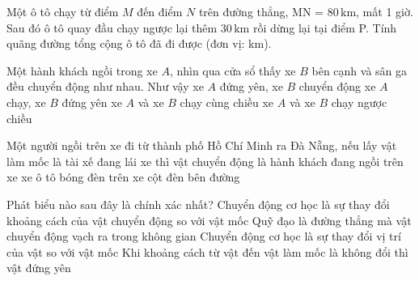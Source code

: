 \begin{ex}
Một ô tô chạy từ điểm $M$ đến điểm $N$ trên đường thẳng, MN = $80\,\text{km}$, mất 1 giờ. Sau đó ô tô quay đầu chạy ngược lại thêm $30\,\text{km}$ rồi dừng lại tại điểm P. Tính quãng đường tổng cộng ô tô đã đi được (đơn vị: km).
\end{ex}

\begin{ex}
Một hành khách ngồi trong xe $A$, nhìn qua cửa sổ thấy xe $B$ bên cạnh và sân ga đều chuyển động như nhau. Như vậy
\choice
{xe $A$ đứng yên, xe $B$ chuyển động}
{xe $A$ chạy, xe $B$ đứng yên}
{\True xe $A$ và xe $B$ chạy cùng chiều}
{xe $A$ và xe $B$ chạy ngược chiều}
\end{ex}


\begin{ex}
Một người ngồi trên xe đi từ thành phố Hồ Chí Minh ra Đà Nẵng, nếu lấy vật làm mốc là tài xế đang lái xe thì vật chuyển động là
\choice
{hành khách đang ngồi trên xe}
{\True xe ô tô}
{bóng đèn trên xe}
{cột đèn bên đường}
\end{ex}


\begin{ex}
Phát biểu nào sau đây là chính xác nhất?
\choice
{Chuyển động cơ học là sự thay đổi khoảng cách của vật chuyển động so với vật mốc}
{Quỹ đạo là đường thẳng mà vật chuyển động vạch ra trong không gian}
{\True Chuyển động cơ học là sự thay đổi vị trí của vật so với vật mốc}
{Khi khoảng cách từ vật đến vật làm mốc là không đổi thì vật đứng yên}
\end{ex}


